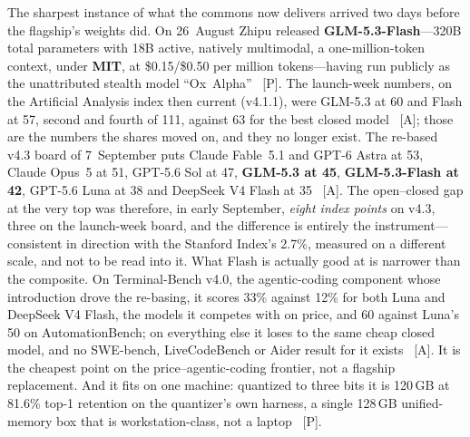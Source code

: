 The sharpest instance of what the commons now delivers arrived two days before the flagship's weights did. On 26~August Zhipu released \textbf{GLM-5.3-Flash}---320B total parameters with 18B active, natively multimodal, a one-million-token context, under \textbf{MIT}, at \$0.15/\$0.50 per million tokens---having run publicly as the unattributed stealth model ``Ox~Alpha''~\cite{glm53-flash} [P]. The launch-week numbers, on the Artificial Analysis index then current (v4.1.1), were GLM-5.3 at 60 and Flash at 57, second and fourth of 111, against 63 for the best closed model~\cite{glm53-aa} [A]; those are the numbers the shares moved on, and they no longer exist. The re-based v4.3 board of 7~September puts Claude Fable~5.1 and GPT-6 Astra at 53, Claude Opus~5 at 51, GPT-5.6 Sol at 47, \textbf{GLM-5.3 at 45}, \textbf{GLM-5.3-Flash at 42}, GPT-5.6 Luna at 38 and DeepSeek V4 Flash at 35~\cite{aa-v43} [A]. The open--closed gap at the very top was therefore, in early September, \emph{eight index points} on v4.3, three on the launch-week board, and the difference is entirely the instrument---consistent in direction with the Stanford Index's 2.7\%, measured on a different scale, and not to be read into it. What Flash is actually good at is narrower than the composite. On Terminal-Bench v4.0, the agentic-coding component whose introduction drove the re-basing, it scores 33\% against 12\% for both Luna and DeepSeek V4 Flash, the models it competes with on price, and 60 against Luna's 50 on AutomationBench; on everything else it loses to the same cheap closed model, and no SWE-bench, LiveCodeBench or Aider result for it exists~\cite{glm53-flash-agentic} [A]. It is the cheapest point on the price--agentic-coding frontier, not a flagship replacement. And it fits on one machine: quantized to three bits it is 120\,GB at 81.6\% top-1 retention on the quantizer's own harness, a single 128\,GB unified-memory box that is workstation-class, not a laptop~\cite{glm53-local} [P].

